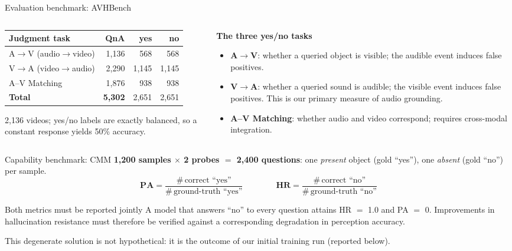 \documentclass[aspectratio=169,11pt]{beamer}
\begin{document}
\begin{frame}{Evaluation benchmark: AVHBench}
\begin{columns}[T]
\begin{column}{0.5\textwidth}
\footnotesize
\setlength{\tabcolsep}{4pt}
\begin{tabular}{@{}lrrr@{}}
\toprule
Judgment task & QnA & yes & no \\
\midrule
A$\to$V (audio$\to$video) & 1,136 & 568 & 568 \\
V$\to$A (video$\to$audio) & 2,290 & 1,145 & 1,145 \\
A--V Matching             & 1,876 & 938 & 938 \\
\midrule
\textbf{Total}            & \textbf{5,302} & 2,651 & 2,651 \\
\bottomrule
\end{tabular}
\par\vspace{0.4em}
{\scriptsize 2,136 videos; yes/no labels are exactly balanced, so a constant response yields 50\%
accuracy.}
\end{column}
\begin{column}{0.5\textwidth}\scriptsize
\textbf{The three yes/no tasks}
\begin{itemize}
\item \textbf{A$\to$V}: whether a queried object is visible; the audible event induces false
positives.
\item \textbf{V$\to$A}: whether a queried sound is audible; the visible event induces false
positives. This is our primary measure of audio grounding.
\item \textbf{A--V Matching}: whether audio and video correspond; requires cross-modal
integration.
\end{itemize}
\end{column}
\end{columns}
\end{frame}

\begin{frame}{Capability benchmark: CMM}
\centering
{\footnotesize \textbf{1,200 samples $\times$ 2 probes $=$ 2,400 questions}: one \emph{present} object
(gold ``yes''), one \emph{absent} (gold ``no'') per sample.}
\vspace{0.5em}
\[
\mathbf{PA}=\frac{\#\,\text{correct ``yes''}}{\#\,\text{ground-truth ``yes''}}
\qquad\qquad
\mathbf{HR}=\frac{\#\,\text{correct ``no''}}{\#\,\text{ground-truth ``no''}}
\]
\begin{center}
\begin{block}{Both metrics must be reported jointly}
\centering\footnotesize A model that answers ``no'' to every question attains HR $=$ 1.0 and PA $=$ 0.
Improvements in hallucination resistance must therefore be verified against a corresponding
degradation in perception accuracy.
\end{block}
\end{center}
\vfill
{\footnotesize This degenerate solution is not hypothetical: it is the outcome of our initial
training run (reported below).}
\end{frame}
\end{document}
